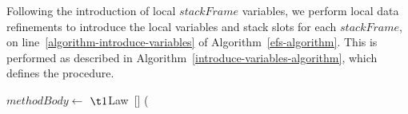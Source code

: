 Following the introduction of local $stackFrame$ variables, we perform
local data refinements to introduce the local variables and stack
slots for each $stackFrame$, on
line~\ref{algorithm-introduce-variables} of
Algorithm~\ref{efs-algorithm}.
This is performed as described in
Algorithm~\ref{introduce-variables-algorithm}, which defines the
 procedure.

\begin{algorithm}
  \begin{algorithmic}[1]
    \label{algortihm-introduce-variables-loop}
    \State $methodBody \gets $ 
    \State {}
    \label{algorithm-introduce-frameClass-assumptions}
    \State {}
    \label{algorithm-apply-refine-PutfieldSF}
    \State {}
    \State {}
    \State {}
    \State {}
    \label{algorithm-apply-refine-NewSF}
    \State {}
    \label{algorithm-introduce-operandStack-assumptions}
    \label{algorithm-local-data-refinement}
    \Statex $\t1${Law~[]}
    ({\arraycolsep=0cm
}
\end{algorithmic}
\end{algorithm}
